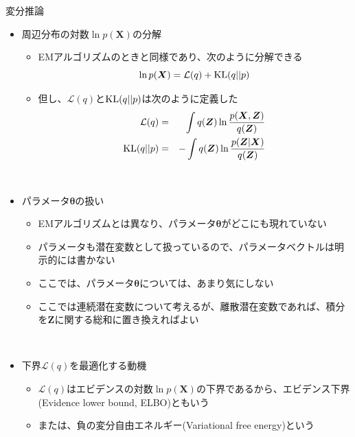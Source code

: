 \documentclass[dvipdfmx,notheorems,t]{beamer}
\begin{document}
\begin{frame}{変分推論}

\begin{itemize}
	\item 周辺分布の対数$\ln p(\bm{X})$の分解
	\begin{itemize}
		\item EMアルゴリズムのときと同様であり、次のように分解できる
		\begin{equation}
			\ln p(\bm{X}) = \mathcal{L}(q) + \operatorname{KL} (q || p)
		\end{equation}
		
		\item 但し、$\mathcal{L}(q)$と$\operatorname{KL} (q || p)$は次のように定義した
		\begin{eqnarray}
			\mathcal{L}(q) &=& \int q(\bm{Z}) \ln \frac{p(\bm{X}, \bm{Z})}{q(\bm{Z})} \\
			\operatorname{KL} (q || p) &=& -\int q(\bm{Z}) \ln \frac{p(\bm{Z} | \bm{X})}{q(\bm{Z})}
		\end{eqnarray}
	\end{itemize} \
		
	\item パラメータ$\bm{\theta}$の扱い
	\begin{itemize}
		\item EMアルゴリズムとは異なり、\color{red}パラメータ$\bm{\theta}$がどこにも現れていない\normalcolor
		\item \alert{パラメータも潜在変数として扱っている}ので、パラメータベクトルは明示的には書かない
		\item ここでは、パラメータ$\bm{\theta}$については、あまり気にしない
		\newline
		\item ここでは連続潜在変数について考えるが、離散潜在変数であれば、積分を$\bm{Z}$に関する総和に置き換えればよい
	\end{itemize} \
	
	\item 下界$\mathcal{L}(q)$を最適化する動機
	\begin{itemize}
		\item $\mathcal{L}(q)$はエビデンスの対数$\ln p(\bm{X})$の下界であるから、\alert{エビデンス下界}(Evidence lower bound, \alert{ELBO})ともいう
		\item または、負の\alert{変分自由エネルギー}(Variational free energy)という
		\newline
		

\end{itemize}
\end{itemize}
\end{frame}
\end{document}
